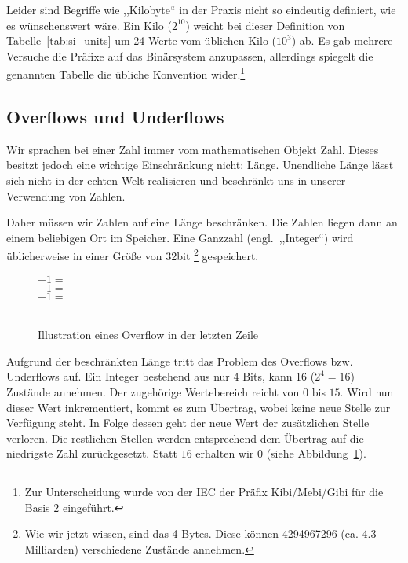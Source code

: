 Leider sind Begriffe wie ,,Kilobyte`` in der Praxis nicht so eindeutig definiert, wie es wünschenswert wäre. Ein Kilo ($2^{10}$) weicht bei dieser Definition von Tabelle~\ref{tab:si_units} um 24 Werte vom üblichen Kilo ($10^3$) ab. Es gab mehrere Versuche die Präfixe auf das Binärsystem anzupassen, allerdings spiegelt die genannten Tabelle die übliche Konvention wider.\footnote{Zur Unterscheidung wurde von der IEC der Präfix Kibi/Mebi/Gibi für die Basis 2 eingeführt.}

\subsection{Overflows und Underflows}
%
Wir sprachen bei einer Zahl immer vom mathematischen Objekt Zahl. Dieses
besitzt jedoch eine wichtige Einschränkung nicht: Länge. Unendliche Länge
lässt sich nicht in der echten Welt realisieren und beschränkt uns in
unserer Verwendung von Zahlen.

Daher müssen wir Zahlen auf eine Länge beschränken. Die Zahlen liegen
dann an einem beliebigen Ort im Speicher. Eine Ganzzahl (engl.~,,Integer``)
wird üblicherweise in einer Größe von 32bit%
\footnote{Wie wir jetzt wissen, sind das 4 Bytes. Diese können 4294967296
(ca. 4.3 Milliarden) verschiedene Zustände annehmen.}
gespeichert.

\begin{figure}[ht]
  \begin{center}
        $+ 1 =$ \\
        $+ 1 =$ \\
        $+ 1 =$ \\
        \hspace{27.5pt}~
  \end{center}
  \caption{Illustration eines Overflow in der letzten Zeile}
  \label{fig:overflow}
\end{figure}
%
Aufgrund der beschränkten Länge tritt das Problem des Overflows bzw.
Underflows auf. Ein Integer bestehend aus nur 4 Bits, kann 16 ($2^4 = 16$)
Zustände annehmen. Der zugehörige Wertebereich reicht von $0$ bis $15$.
Wird nun dieser Wert inkrementiert, kommt es zum Übertrag, wobei keine
neue Stelle zur Verfügung steht. In Folge dessen geht der neue Wert der
zusätzlichen Stelle verloren. Die restlichen Stellen werden entsprechend
dem Übertrag auf die niedrigste Zahl zurückgesetzt. Statt $16$ erhalten wir
$0$ (siehe Abbildung~\ref{fig:overflow}).

